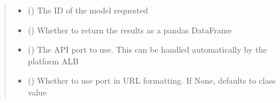 \documentclass[letterpaper,10pt,english]{sphinxmanual}
\begin{document}
\begin{fulllineitems}
\begin{fulllineitems}
\begin{sphinxVerbatim}[commandchars=\\\{\}]
 
  
\end{sphinxVerbatim}
\begin{quote}\begin{description}
\begin{itemize}
\item {} 
\sphinxAtStartPar
{} () \textendash{} The ID of the model requested

\item {} 
\sphinxAtStartPar
{} (\sphinxstyleliteralemphasis{\sphinxupquote{ (}}\sphinxstyleliteralemphasis{\sphinxupquote{)}}) \textendash{} Whether to return the results as a pandas DataFrame

\item {} 
\sphinxAtStartPar
{} (\sphinxstyleliteralemphasis{\sphinxupquote{ (}}\sphinxstyleliteralemphasis{\sphinxupquote{)}}) \textendash{} The API port to use. This can be handled automatically by the platform ALB

\item {} 
\sphinxAtStartPar
{} (\sphinxstyleliteralemphasis{\sphinxupquote{ (}}\sphinxstyleliteralemphasis{\sphinxupquote{)}}) \textendash{} Whether to use port in URL formatting. If None, defaults to class value

\end{itemize}


\end{description}
\end{quote}
\end{fulllineitems}
\end{fulllineitems}
\end{document}

